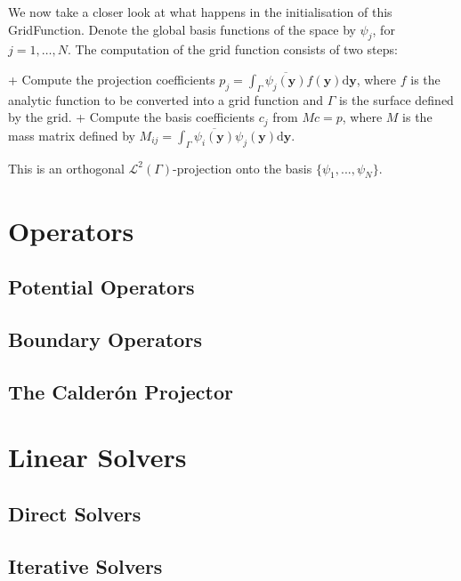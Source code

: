 \documentclass[a4paper]{book}
\begin{document}
We now take a closer look at what happens in the initialisation of this GridFunction.
Denote the global basis functions of the space by $\psi_j$, for $j=1,\dots,N$.
The computation of the grid function consists of two steps:

+ Compute the projection coefficients
  $p_j=\int_{\Gamma}\overline{\psi_j(\mathbf{y})}f(\mathbf{y})\mathrm{d}\mathbf{y}$,
  where $f$ is the analytic function to be converted into a grid function and $\Gamma$
  is the surface defined by the grid.
+ Compute the basis coefficients $c_j$ from $Mc=p$, where $M$ is the mass matrix defined by
  $M_{ij}=\int_{\Gamma}\overline{\psi_i(\mathbf{y})}\psi_j(\mathbf{y})\mathrm{d}\mathbf{y}$.

This is an orthogonal $\mathcal{L}^2(\Gamma)$-projection onto the basis $\{\psi_1,...,\psi_N\}$.


\chapter{Operators}



\section{Potential Operators}



\section{Boundary Operators}



\section{The Calder\'on Projector}



\chapter{Linear Solvers}



\section{Direct Solvers}



\section{Iterative Solvers}
\end{document}
